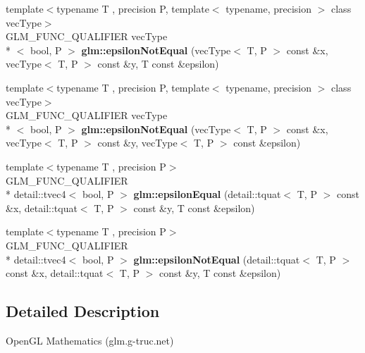 \begin{DoxyCompactItemize}
\item 
\hypertarget{namespaceglm_a76da74051c42eebf3256cd31464fa043}{{\footnotesize template$<$typename T , precision P, template$<$ typename, precision $>$ class vec\-Type$>$ }\\G\-L\-M\-\_\-\-F\-U\-N\-C\-\_\-\-Q\-U\-A\-L\-I\-F\-I\-E\-R vec\-Type\\*
$<$ bool, P $>$ {\bfseries glm\-::epsilon\-Not\-Equal} (vec\-Type$<$ T, P $>$ const \&x, vec\-Type$<$ T, P $>$ const \&y, T const \&epsilon)}\label{namespaceglm_a76da74051c42eebf3256cd31464fa043}

\item 
\hypertarget{namespaceglm_a34387d61360bf88bcca96b797f53e49d}{{\footnotesize template$<$typename T , precision P, template$<$ typename, precision $>$ class vec\-Type$>$ }\\G\-L\-M\-\_\-\-F\-U\-N\-C\-\_\-\-Q\-U\-A\-L\-I\-F\-I\-E\-R vec\-Type\\*
$<$ bool, P $>$ {\bfseries glm\-::epsilon\-Not\-Equal} (vec\-Type$<$ T, P $>$ const \&x, vec\-Type$<$ T, P $>$ const \&y, vec\-Type$<$ T, P $>$ const \&epsilon)}\label{namespaceglm_a34387d61360bf88bcca96b797f53e49d}

\item 
\hypertarget{namespaceglm_a4c75af68224e0fea510364c0ef246a46}{{\footnotesize template$<$typename T , precision P$>$ }\\G\-L\-M\-\_\-\-F\-U\-N\-C\-\_\-\-Q\-U\-A\-L\-I\-F\-I\-E\-R \\*
detail\-::tvec4$<$ bool, P $>$ {\bfseries glm\-::epsilon\-Equal} (detail\-::tquat$<$ T, P $>$ const \&x, detail\-::tquat$<$ T, P $>$ const \&y, T const \&epsilon)}\label{namespaceglm_a4c75af68224e0fea510364c0ef246a46}

\item 
\hypertarget{namespaceglm_a7f1b10921333eeda77cd5c1f4a4b2101}{{\footnotesize template$<$typename T , precision P$>$ }\\G\-L\-M\-\_\-\-F\-U\-N\-C\-\_\-\-Q\-U\-A\-L\-I\-F\-I\-E\-R \\*
detail\-::tvec4$<$ bool, P $>$ {\bfseries glm\-::epsilon\-Not\-Equal} (detail\-::tquat$<$ T, P $>$ const \&x, detail\-::tquat$<$ T, P $>$ const \&y, T const \&epsilon)}\label{namespaceglm_a7f1b10921333eeda77cd5c1f4a4b2101}

\end{DoxyCompactItemize}


\subsection{Detailed Description}
Open\-G\-L Mathematics (glm.\-g-\/truc.\-net)

